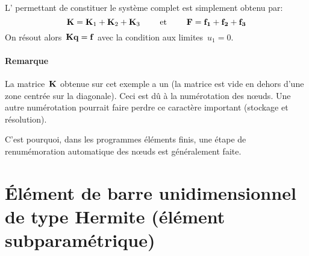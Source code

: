 \medskipvm
L' permettant de constituer le système complet est simplement obtenu par:
\begin{equation} \MM{K}=\MM{K}_1+\MM{K}_2+\MM{K}_3 \qquad \text{ et } \qquad \VV{F}=\VV{f_1}+\VV{f_2}+\VV{f_3} \end{equation}
\medskipvm
On résout alors~$\MM{K}\VV{q}=\VV{f}$ avec la condition aux limites~$u_1=0$.
\medskipvm
\paragraph{Remarque}
La matrice~$\MM{K}$ obtenue sur cet exemple a un  (la matrice est 
vide en dehors d'une zone centrée sur la diagonale). Ceci est dû à la numérotation des nœuds. 
Une autre numérotation pourrait faire perdre ce caractère important (stockage et résolution).

C'est pourquoi, dans les programmes éléments finis, une étape de renumémoration automatique des nœuds
est généralement faite.
\medskipvm
\ifVersionAvecExemplesSepares
  \section{Élément de barre unidimensionnel de type Hermite (élément subparamétrique)}
\else
